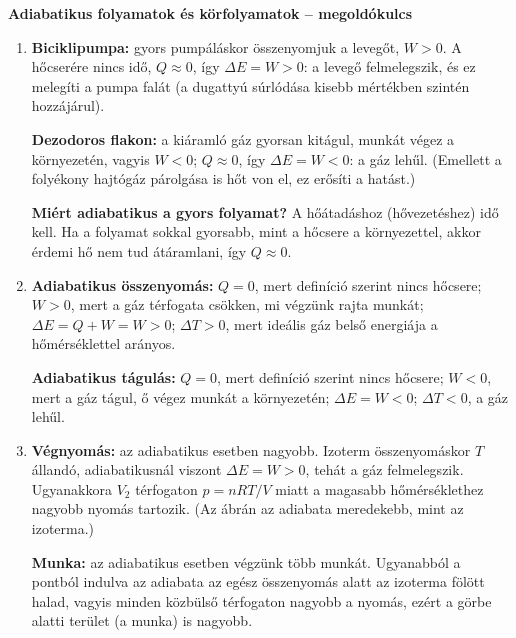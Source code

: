 \documentclass[11pt,a4paper]{article}
\begin{document}
\begin{center}
  {\large\bfseries Adiabatikus folyamatok és körfolyamatok -- megoldókulcs}\\[5pt]
\end{center}

\begin{enumerate}
\item \textbf{Biciklipumpa:} gyors pumpáláskor összenyomjuk a levegőt, $W > 0$. A hőcserére
  nincs idő, $Q \approx 0$, így $\Delta E = W > 0$: a levegő felmelegszik, és ez melegíti a
  pumpa falát (a dugattyú súrlódása kisebb mértékben szintén hozzájárul).

  \textbf{Dezodoros flakon:} a kiáramló gáz gyorsan kitágul, munkát végez a környezetén,
  vagyis $W < 0$; $Q \approx 0$, így $\Delta E = W < 0$: a gáz lehűl. (Emellett a
  folyékony hajtógáz párolgása is hőt von el, ez erősíti a hatást.)

  \textbf{Miért adiabatikus a gyors folyamat?} A hőátadáshoz (hővezetéshez) idő kell. Ha a
  folyamat sokkal gyorsabb, mint a hőcsere a környezettel, akkor érdemi hő nem tud
  átáramlani, így $Q \approx 0$.

\item \textbf{Adiabatikus összenyomás:}
  $Q = 0$, mert definíció szerint nincs hőcsere;
  $W > 0$, mert a gáz térfogata csökken, mi végzünk rajta munkát;
  $\Delta E = Q + W = W > 0$;
  $\Delta T > 0$, mert ideális gáz belső energiája a hőmérséklettel arányos.

  \textbf{Adiabatikus tágulás:}
  $Q = 0$, mert definíció szerint nincs hőcsere;
  $W < 0$, mert a gáz tágul, ő végez munkát a környezetén;
  $\Delta E = W < 0$;
  $\Delta T < 0$, a gáz lehűl.

\item \textbf{Végnyomás:} az adiabatikus esetben nagyobb. Izoterm összenyomáskor $T$
  állandó, adiabatikusnál viszont $\Delta E = W > 0$, tehát a gáz felmelegszik. Ugyanakkora
  $V_2$ térfogaton $p = nRT/V$ miatt a magasabb hőmérséklethez nagyobb nyomás tartozik.
  (Az ábrán az adiabata meredekebb, mint az izoterma.)

  \textbf{Munka:} az adiabatikus esetben végzünk több munkát. Ugyanabból a pontból indulva
  az adiabata az egész összenyomás alatt az izoterma fölött halad, vagyis minden
  közbülső térfogaton nagyobb a nyomás, ezért a görbe alatti terület (a munka) is
  nagyobb.


\end{enumerate}
\end{document}
